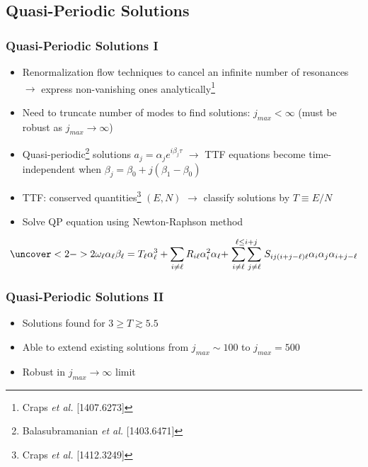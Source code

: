 \documentclass[mathserif,10pt]{beamer}
\newcommand{\bi}{\begin{itemize}}
\newcommand{\ei}{\end{itemize}}
\newcommand{\its}{\item}
\newcommand{\scr}{\scriptsize}
\newcommand{\jm}{j_{max}}
\begin{document}
{%

\subsection{Quasi-Periodic Solutions}
\frame
{
  \frametitle{Quasi-Periodic Solutions I}
  \bi 
  \its Renormalization flow techniques to cancel an infinite number of resonances $\to$ express non-vanishing ones analytically\footnote<1->{{\scr Craps {\it et al.} [1407.6273]}}
  \its Need to truncate number of modes to find solutions: $\jm < \infty$ (must be robust as $\jm \to \infty$)
  \its<2->{Quasi-periodic\footnote<2->{{\scr Balasubramanian {\it et al.} [1403.6471]}} solutions $a_j = \alpha_j e^{i \beta_j \tau}$ $\to$ TTF equations become time-independent when $\beta_j = \beta_0 + j(\beta_1 - \beta_0)$}
  \its<2->{TTF: conserved quantities\footnote<2->{{\scr Craps {\it et al.} [1412.3249]}} $(E, N)$ $\to$ classify solutions by $T \equiv E/N$}
  \its<2->{Solve QP equation using Newton-Raphson method}
  \ei
  \vspace{-0.15in}
  \begin{overlayarea}{\textwidth}{0.2\textheight}
   \begin{align*}
   \uncover<2->{
  2\omega_\ell \alpha_\ell \beta_\ell = T_\ell \alpha_\ell^3 + \sum_{i \neq \ell} R_{i\ell} \alpha_i^2 \alpha_\ell + \stackrel{\ell \leq i + j}{\sum_{i \neq \ell} \sum_{j \neq \ell}} S_{i j (i+j-\ell)\ell} \alpha_i \alpha_j \alpha_{i+j-\ell}
  }
  \end{align*}
  \end{overlayarea}
}

\frame
{
  \frametitle{Quasi-Periodic Solutions II}
  \bi
  \its Solutions found for $3 \geq T \gtrsim 5.5$
  \its Able to extend existing solutions from $\jm \sim 100$ to $\jm = 500$
  \its Robust in $\jm \to \infty$ limit
  \ei
  
}}
\end{document}
